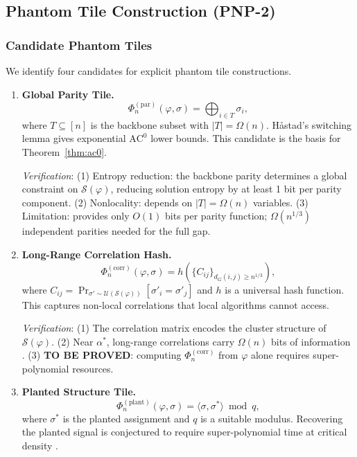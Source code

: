 \documentclass[11pt]{article}
\theoremstyle{definition}
\theoremstyle{remark}
\newcommand{\calS}{\mathcal{S}}
\newcommand{\ACz}{\mathrm{AC}^0}
\begin{document}
\subsection{Phantom Tile Construction (PNP-2)}

\subsubsection{Candidate Phantom Tiles}

We identify four candidates for explicit phantom tile constructions.

\begin{enumerate}
  \item \textbf{Global Parity Tile.}
    \[
      \Phi_n^{(\mathrm{par})}(\varphi, \sigma) = \bigoplus_{i \in T} \sigma_i,
    \]
    where $T \subseteq [n]$ is the backbone subset with $|T| = \Omega(n)$.
    H\aa stad's switching lemma gives exponential $\ACz$ lower bounds.
    This candidate is the basis for Theorem~\ref{thm:ac0}.

    \emph{Verification}: (1) Entropy reduction: the backbone parity determines
    a global constraint on $\calS(\varphi)$, reducing solution entropy by at
    least 1 bit per parity component. (2) Nonlocality: depends on $|T| = \Omega(n)$
    variables. (3) Limitation: provides only $O(1)$ bits per parity function;
    $\Omega(n^{1/3})$ independent parities needed for the full gap.

  \item \textbf{Long-Range Correlation Hash.}
    \[
      \Phi_n^{(\mathrm{corr})}(\varphi, \sigma) = h\!\left(
        \{C_{ij}\}_{d_G(i,j) \geq n^{1/3}}
      \right),
    \]
    where $C_{ij} = \Pr_{\sigma' \sim \mathcal{U}(\calS(\varphi))}[\sigma'_i = \sigma'_j]$
    and $h$ is a universal hash function.  This captures non-local correlations
    that local algorithms cannot access.

    \emph{Verification}: (1) The correlation matrix encodes the cluster structure
    of $\calS(\varphi)$. (2) Near $\alpha^*$, long-range correlations carry
    $\Omega(n)$ bits of information \cite{MPZ}. (3) \textbf{TO BE PROVED}:
    computing $\Phi_n^{(\mathrm{corr})}$ from $\varphi$ alone requires
    super-polynomial resources.

  \item \textbf{Planted Structure Tile.}
    \[
      \Phi_n^{(\mathrm{plant})}(\varphi, \sigma) = \langle \sigma, \sigma^* \rangle \bmod q,
    \]
    where $\sigma^*$ is the planted assignment and $q$ is a suitable modulus.
    Recovering the planted signal is conjectured to require super-polynomial time
    at critical density \cite{planted}.


\end{enumerate}
\end{document}
